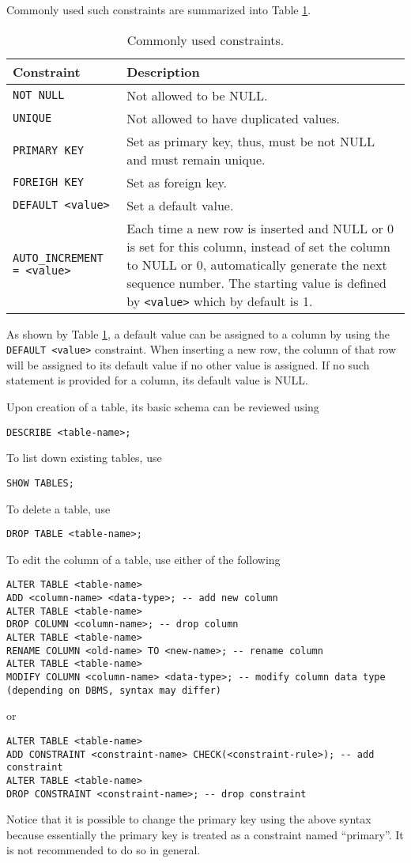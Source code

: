 Commonly used such constraints are summarized into Table \ref{ch:db:tab:constraints}.
\begin{table}
	\centering \caption{Commonly used constraints.}\label{ch:db:tab:constraints}
	\begin{tabularx}{\textwidth}{lX}
		\hline
		Constraint & Description \\ \hline
		\verb|NOT NULL| & Not allowed to be NULL. \\ \hdashline
		\verb|UNIQUE| & Not allowed to have duplicated values. \\ \hdashline
        \verb|PRIMARY KEY| & Set as primary key, thus, must be not NULL and must remain unique. \\ \hdashline
        \verb|FOREIGH KEY| & Set as foreign key. \\ \hdashline
        \verb|DEFAULT <value>| & Set a default value. \\ \hdashline
        \verb|AUTO_INCREMENT = <value>| & Each time a new row is inserted and NULL or 0 is set for this column, instead of set the column to NULL or 0, automatically generate the next sequence number. The starting value is defined by \verb|<value>| which by default is 1. \\
		 \hline
	\end{tabularx}
\end{table}
As shown by Table \ref{ch:db:tab:constraints}, a default value can be assigned to a column by using the \verb|DEFAULT <value>| constraint. When inserting a new row, the column of that row will be assigned to its default value if no other value is assigned. If no such statement is provided for a column, its default value is NULL.

Upon creation of a table, its basic schema can be reviewed using
\begin{lstlisting}
DESCRIBE <table-name>;
\end{lstlisting}
To list down existing tables, use
\begin{lstlisting}
SHOW TABLES;
\end{lstlisting}
To delete a table, use
\begin{lstlisting}
DROP TABLE <table-name>;
\end{lstlisting}

To edit the column of a table, use either of the following
\begin{lstlisting}
ALTER TABLE <table-name>
ADD <column-name> <data-type>; -- add new column
ALTER TABLE <table-name>
DROP COLUMN <column-name>; -- drop column
ALTER TABLE <table-name>
RENAME COLUMN <old-name> TO <new-name>; -- rename column
ALTER TABLE <table-name>
MODIFY COLUMN <column-name> <data-type>; -- modify column data type (depending on DBMS, syntax may differ)
\end{lstlisting}
or
\begin{lstlisting}
ALTER TABLE <table-name>
ADD CONSTRAINT <constraint-name> CHECK(<constraint-rule>); -- add constraint
ALTER TABLE <table-name>
DROP CONSTRAINT <constraint-name>; -- drop constraint
\end{lstlisting}
Notice that it is possible to change the primary key using the above syntax because essentially the primary key is treated as a constraint named ``primary''. It is not recommended to do so in general.

